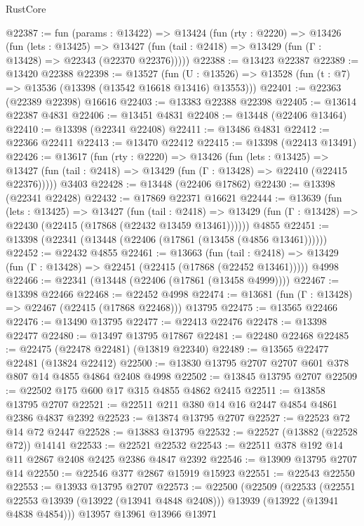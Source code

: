 \begin{lexlean}{RustCore}
\begin{coremodule}
@22387 := fun (params : @13422) =>
  @13424
    (fun (rty : @2220) =>
    @13426
      (fun (lets : @13425) =>
      @13427 (fun (tail : @2418) => @13429 (fun (Γ : @13428) => @22343 (@22370 @22376)))))
@22388 := @13423 @22387
@22389 := @13420 @22388
@22398 := @13527
    (fun (U : @13526) => @13528 (fun (t : @7) => @13536 (@13398 (@13542 @16618 @13416) @13553)))
@22401 := @22363 (@22389 @22398) @16616
@22403 := @13383 @22388 @22398
@22405 := @13614 @22387 @4831
@22406 := @13451 @4831
@22408 := @13448 (@22406 @13464)
@22410 := @13398 (@22341 @22408)
@22411 := @13486 @4831
@22412 := @22366 @22411
@22413 := @13470 @22412
@22415 := @13398 (@22413 @13491)
@22426 := @13617
    (fun (rty : @2220) =>
    @13426
      (fun (lets : @13425) =>
      @13427 (fun (tail : @2418) => @13429 (fun (Γ : @13428) => @22410 (@22415 @22376)))))
    @3403
@22428 := @13448 (@22406 @17862)
@22430 := @13398 (@22341 @22428)
@22432 := @17869 @22371 @16621
@22444 := @13639
    (fun (lets : @13425) =>
    @13427
      (fun (tail : @2418) =>
      @13429 (fun (Γ : @13428) => @22430 (@22415 (@17868 (@22432 @13459 @13461))))))
    @4855
@22451 := @13398 (@22341 (@13448 (@22406 (@17861 (@13458 (@4856 @13461))))))
@22452 := @22432 @4855
@22461 := @13663
    (fun (tail : @2418) => @13429 (fun (Γ : @13428) => @22451 (@22415 (@17868 (@22452 @13461)))))
    @4998
@22466 := @22341 (@13448 (@22406 (@17861 (@13458 @4999))))
@22467 := @13398 @22466
@22468 := @22452 @4998
@22474 := @13681 (fun (Γ : @13428) => @22467 (@22415 (@17868 @22468))) @13795
@22475 := @13565 @22466
@22476 := @13490 @13795
@22477 := @22413 @22476
@22478 := @13398 @22477
@22480 := @13497 @13795 @17867
@22481 := @22480 @22468
@22485 := @22475 (@22478 @22481) (@13819 @22340)
@22489 := @13565 @22477 @22481 (@13824 @22412)
@22500 := @13830 @13795 @2707 @2707 @601 @378 @807 @14 @4855 @4864 @2408 @4998
@22502 := @13845 @13795 @2707
@22509 := @22502 @175 @600 @17 @315 @4855 @4862 @2415
@22511 := @13858 @13795 @2707
@22521 := @22511 @211 @380 @14 @16 @2447 @4854 @4861 @2386 @4837 @2392
@22523 := @13874 @13795 @2707
@22527 := @22523 @72 @14 @72 @2447
@22528 := @13883 @13795
@22532 := @22527 (@13882 (@22528 @72)) @14141
@22533 := @22521 @22532
@22543 := @22511 @378 @192 @14 @11 @2867 @2408 @2425 @2386 @4847 @2392
@22546 := @13909 @13795 @2707 @14
@22550 := @22546 @377 @2867 @15919 @15923
@22551 := @22543 @22550
@22553 := @13933 @13795 @2707
@22573 := @22500
    (@22509
      (@22533
        (@22551 @22553 @13939 (@13922 (@13941 @4848 @2408)))
        @13939
        (@13922 (@13941 @4838 @4854)))
      @13957
      @13961
      @13966
      @13971

\end{coremodule}
\end{lexlean}
